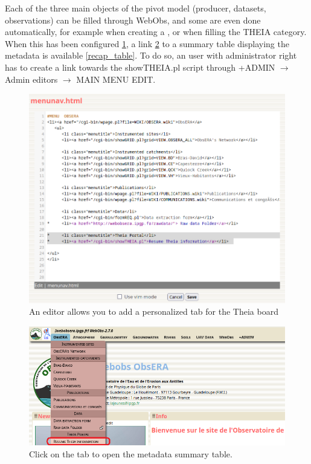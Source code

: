 Each of the three main objects of the pivot model (producer, datasets, observations) can be filled through WebObs, and some are even done automatically, for example when creating a , or when filling the THEIA category. When this has been configured \ref{menu_config}, a link \ref{showTHEIA} to a summary table displaying the metadata is available \ref{recap_table}. To do so, an user with administrator right has to create a link towards the showTHEIA.pl script through +ADMIN $\rightarrow$ Admin editors $\rightarrow$ MAIN MENU EDIT.

\begin{figure}[!h]
	\centering
	\includegraphics[width=\textwidth]{figures/theia/menu_config.png}
	\caption{An editor allows you to add a personalized tab for the Theia board}
	\label{menu_config}
\end{figure}

\begin{figure}[!h]
	\centering
	\includegraphics[width=\textwidth]{figures/theia/theia_menu.png}
	\caption{Click on the tab to open the metadata summary table.}
	\label{showTHEIA}
\end{figure}

